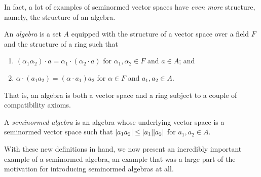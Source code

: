 In fact, a lot of examples of seminormed vector spaces have \emph{even more} structure, namely, the structure of an algebra.
\begin{dfn}[Algebra]\label{Algebra}
An \emph{algebra} is a set $A$ equipped with the structure of a vector space over a field $F$ and the structure of a ring such that
\begin{enumerate}
\item $(\alpha _1\alpha _2)\cdot a=\alpha _1\cdot (\alpha _2\cdot a)$ for $\alpha _1,\alpha _2\in F$ and $a\in A$; and
\item $\alpha \cdot (a_1a_2)=(\alpha \cdot a_1)a_2$ for $\alpha \in F$ and $a_1,a_2\in A$.
\end{enumerate}
\begin{rmk}
That is, an algebra is both a vector space and a ring subject to a couple of compatibility axioms.
\end{rmk}
\end{dfn}
\begin{dfn}\label{SeminormedAlgebra}
A \emph{seminormed algebra} is an algebra whose underlying vector space is a seminormed vector space such that $\norm[a_1a_2]\leq \norm[a_1]\norm[a_2]$ for $a_1,a_2\in A$.
\end{dfn}
With these new definitions in hand, we now present an incredibly important example of a seminormed algebra, an example that was a large part of the motivation for introducing seminormed algebras at all.

